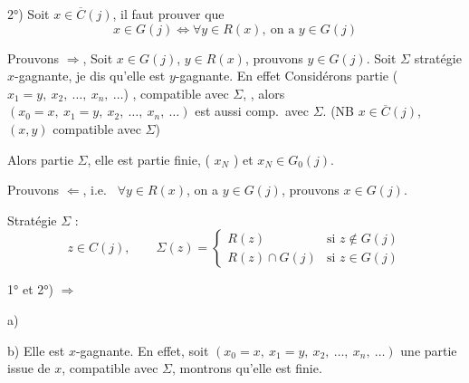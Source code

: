 \documentclass[11pt,a4paper]{article}
\begin{document}
2°) Soit $x\in\overline{C}(j)$, il faut prouver que
\[
  x\in G(j)\Longleftrightarrow \forall y\in R(x),\ \text{on a } y\in G(j)
\]


Prouvons $\Longrightarrow$, Soit $x\in G(j)$, $y\in R(x)$, prouvons $y\in G(j)$. Soit $\Sigma$ \struck{\ill{}} stratégie \struck{\ill{}} $x$-gagnante, \struck{\ill{}} je dis qu'elle est $y$-gagnante. En effet
\struck{\ill{}} Considérons \struck{\ill{}} partie (\struck{\ill{}} $x_1=y,\ x_2,\ \ldots,\ x_n,\ \ldots$) , compatible avec $\Sigma$, \struck{\ill{}}, alors $(x_0=x,\ x_1=y,\ x_2,\ \ldots,\ x_n,\ \ldots)$ est aussi comp.\ avec $\Sigma$. (NB \ill{} $x\in\overline{C}(j)$, \ill{} $(x,y)$ compatible avec $\Sigma$)

Alors partie \ill{} \ill{} $\Sigma$, elle est partie finie, (\ill{} $x_N$ \ill{}) et $x_N\in G_0(j)$.


Prouvons $\Longleftarrow$, i.e.\  $\forall y\in R(x)$, on a $y\in G(j)$, prouvons $x\in G(j)$.

Stratégie $\Sigma$  :
\[
  z\in C(j), \qquad
  \Sigma(z)=\begin{cases}
    R(z) & \text{si } z\notin G(j)\\
    R(z)\cap G(j) & \text{si } z\in G(j)
  \end{cases}
\]

 1° et 2°) $\Longrightarrow$ 

a) 

b) Elle est $x$-gagnante. En effet, soit $(x_0=x,\ x_1=y,\ x_2,\ \ldots,\ x_n,\ \ldots)$ une partie issue de $x$, compatible avec $\Sigma$, \ill{} montrons qu'elle est finie.
\end{document}
